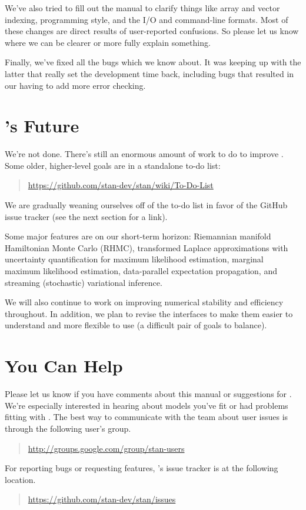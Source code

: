 We've also tried to fill out the manual to clarify things like array
and vector indexing, programming style, and the I/O and command-line
formats.  Most of these changes are direct results of user-reported
confusions.  So please let us know where we can be clearer or more
fully explain something.

Finally, we've fixed all the bugs which we know about.  It was keeping
up with the latter that really set the development time back,
including bugs that resulted in our having to add more error checking.


\section*{\Stan's Future}

We're not done. There's still an enormous amount of work to do to
improve \Stan.  Some older, higher-level goals are in a standalone
to-do list:
%
\begin{quote}
\url{https://github.com/stan-dev/stan/wiki/To-Do-List}
\end{quote}

%
We are gradually weaning ourselves off of the to-do list in favor of
the GitHub issue tracker (see the next section for a link).

Some major features are on our short-term horizon: Riemannian manifold
Hamiltonian Monte Carlo (RHMC), transformed Laplace approximations
with uncertainty quantification for maximum likelihood estimation,
marginal maximum likelihood estimation, data-parallel expectation
propagation, and streaming (stochastic) variational inference. 

We will also continue to work on improving numerical stability and
efficiency throughout.  In addition, we plan to revise the interfaces
to make them easier to understand and more flexible to use (a
difficult pair of goals to balance).


\section*{You Can Help}

Please let us know if you have comments about this manual or
suggestions for \Stan.  We're especially interested in hearing about
models you've fit or had problems fitting with \Stan.  The best way to
communicate with the \Stan team about user issues is through the
following user's group.
%
\begin{quote}
\url{http://groups.google.com/group/stan-users}
\end{quote}
%
For reporting bugs or requesting features, \Stan's issue tracker is at
the following location.
%
\begin{quote}
\url{https://github.com/stan-dev/stan/issues}
\end{quote}

